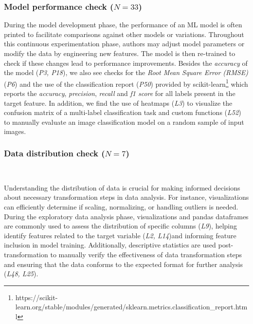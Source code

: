 \subsubsection{Model performance check ($N = 33$)}

During the model development phase, the performance of an ML model is often printed to facilitate comparisons against other models or variations. Throughout this continuous experimentation phase, authors may adjust model parameters or modify the data by engineering new features. The model is then re-trained to check if these changes lead to performance improvements. Besides the \emph{accuracy} of the model (\emph{P3, P18}), we also see checks for the \emph{Root Mean Square Error (RMSE)} (\emph{P6}) and the use of the classification report (\emph{P50}) provided by scikit-learn\footnote{https://scikit-learn.org/stable/modules/generated/sklearn.metrics.classification\_report.html} which reports the \emph{accuracy}, \emph{precision}, \emph{recall} and \emph{f1 score} for all labels present in the target feature. In addition, we find the use of heatmaps (\emph{L3}) to visualize the confusion matrix of a multi-label classification task and custom functions (\emph{L52}) to manually evaluate an image classification model on a random sample of input images.


\subsubsection{Data distribution check ($N = 7$)}~\label{sec:data-distribution-output}

Understanding the distribution of data is crucial for making informed decisions about necessary transformation steps in data analysis. For instance, visualizations can efficiently determine if scaling, normalizing, or handling outliers is needed. During the exploratory data analysis phase, visualizations and pandas dataframes are commonly used to assess the distribution of specific columns (\emph{L9}), helping identify features related to the target variable (\emph{L2, L14})and informing feature inclusion in model training. Additionally, descriptive statistics are used post-transformation to manually verify the effectiveness of data transformation steps and ensuring that the data conforms to the expected format for further analysis (\emph{L48, L25}).

